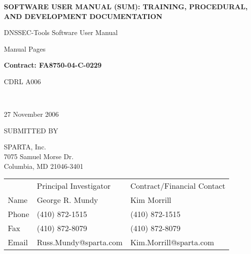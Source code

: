\documentclass[12pt]{article}
\begin{document}

\begin{titlepage}

\vspace{.5in}

\begin{center}
\LARGE{\bf
SOFTWARE USER MANUAL (SUM):
TRAINING, PROCEDURAL, AND
DEVELOPMENT DOCUMENTATION
}
\vspace{1in}

\Large{
DNSSEC-Tools Software User Manual

Manual Pages
\vspace{0.5in}

{\bf Contract: FA8750-04-C-0229
\vspace{0.125in}

CDRL A006}\\
}
27 November 2006
\end{center}

\vspace{.5in}

SUBMITTED BY

SPARTA, Inc.\\
7075 Samuel Morse Dr.\\
Columbia, MD 21046-3401
\vspace{0.25in}

\begin{table}[hb]
\begin{tabular}{lll}
	& Principal Investigator	& Contract/Financial Contact\\
Name	& George R. Mundy		& Kim Morrill\\
Phone	& (410) 872-1515		& (410) 872-1515\\
Fax	& (410) 872-8079		& (410) 872-8079\\
Email	& Russ.Mundy@sparta.com		& Kim.Morrill@sparta.com\\
\end{tabular}
\end{table}

\end{titlepage}


\end{document}
